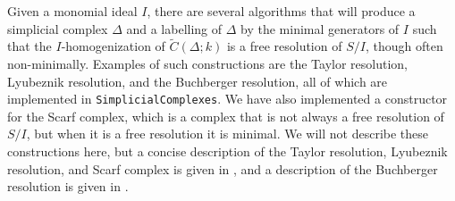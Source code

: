 \documentclass[12pt,leqno]{amsart}
\theoremstyle{definition}
\begin{document}
%
Given a monomial ideal $I$, there are several algorithms that will produce a simplicial complex $\Delta$ and a labelling of $\Delta$ by the minimal generators of $I$ such that the $I$-homogenization of $\widetilde C(\Delta; k)$ is a free resolution of $S/I$, though often non-minimally. Examples of such constructions are the Taylor resolution, Lyubeznik resolution, and the Buchberger resolution, all of which are implemented in \texttt{SimplicialComplexes}. We have also implemented a constructor for the Scarf complex, which is a complex that is not always a free resolution of $S/I$, but when it is a free resolution it is minimal. We will not describe these constructions here, but a concise description of the Taylor resolution, Lyubeznik resolution, and Scarf complex is given in \cite{Mermin}, and a description of the Buchberger resolution is given in \cite{OW}. 
% 
\end{document}
